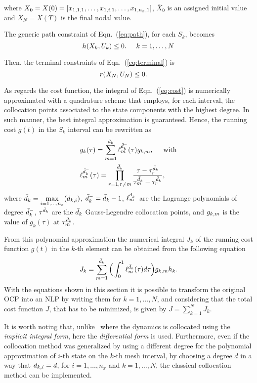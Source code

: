 where $X_0 = X(0) = [x_{1,1,1}, \dots, x_{1,i,1}, \dots, x_{1,n_{x},1}]$, $\bar{X}_{0}$ is an assigned initial value and $X_{N} = X(T)$ is the final nodal value.


The generic path constraint of Eqn.~(\ref{eq:path}), for each $S_k$, becomes
\begin{equation}\label{eq:nlpath}
h(X_k, U_k) \leq 0. \hspace{5mm} k = 1, \dots, N
\end{equation}

Then, the terminal constraints of Eqn.~(\ref{eq:terminal}) is
\begin{equation}\label{eq:npterminal}
	r(X_N, U_N) \leq 0. \hspace{5mm}
\end{equation}

As regards the cost function, the integral of Eqn.~(\ref{eq:cost}) is numerically approximated with a quadrature scheme that employs, for each interval, the collocation points associated to the state components with the highest degree. In such manner, the best integral approximation is guaranteed. Hence, the running cost $g(t)$ in the $S_k$ interval can be rewritten as
\begin{subequations}
	\begin{align}
	& g_k(\tau) = \sum_{m=1}^{\bar{d}_k} \ell_{m}^{\bar{d}_{k}^{-}}(\tau)g_{k,m}, \hspace{5mm} \text{with} \label{eq:nlpcost}\\
	&  \ell_{m}^{\bar{d}_{k}^{-}} (\tau) = \prod_{r=1, r\neq m}^{\bar{d}_k} \dfrac{\tau - \tau^{\bar{d}_{k}}_{r}}{\tau^{\bar{d}_{k}}_{m} - \tau^{\bar{d}_{k}}_{r}}, \label{eq:nlplm}
	\end{align}
\end{subequations}
where $\bar{d}_k = \max\limits_{i= 1, \dots, n_x}(d_{k,i})$, $\bar{d}_k^{-} = \bar{d}_k -1$, $\ell_{m}^{\bar{d}_{k}^{-}}$ are the Lagrange polynomials of degree $\bar{d}_k^{-}$, $\tau^{\bar{d}_{k}}$ are the $\bar{d}_k$ Gauss-Legendre collocation points, and $g_{k,m}$ is the value of $g_k (\tau)$ at $\tau^{\bar{d}_{k}}_{m}$.

From this polynomial approximation the numerical integral $J_k$ of the running cost function $g(t)$ in the $k$-th element can be obtained from the following equation
\begin{equation}\label{eq:nlpcostk}
	J_k = \sum_{m=1}^{\bar{d}_k}\Big(\int_{0}^{1}\ell_{m}^{\bar{d}_{k}}(\tau)d\tau\Big)g_{k,m} h_{k}.
\end{equation}
With the equations shown in this section it is possible to transform the original OCP into an NLP by writing them for $k = 1, \dots, N$, and considering that the total cost function $J$, that has to be minimized, is given by $J = \sum_{k=1}^{N}J_k$.

It is worth noting that, unlike~\cite{Patterson:OCAM:2015} where the dynamics is collocated using the \emph{implicit integral form}, here the \emph{differential form} is used.
Furthermore, even if the collocation method was generalized by using a different degree for the polynomial approximation of $i$-th state on the $k$-th mesh interval, by choosing a degree $d$ in a way that $d_{k,i} = d$, for $i = 1, \dots, n_x$ and $k = 1, \dots, N$, the classical collocation method can be implemented.
